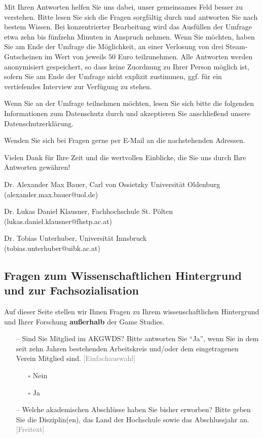 \documentclass{scrartcl}
\begin{document}
Mit Ihren Antworten helfen Sie uns dabei, unser gemeinsames Feld besser zu verstehen.
Bitte lesen Sie sich die Fragen sorgfältig durch und antworten Sie nach bestem Wissen.
Bei konzentrierter Bearbeitung wird das Ausfüllen der Umfrage etwa zehn bis fünfzehn Minuten in Anspruch nehmen.
Wenn Sie möchten, haben Sie am Ende der Umfrage die Möglichkeit, an einer Verlosung von drei Steam-Gutscheinen im Wert von jeweils $50$ Euro teilzunehmen.
Alle Antworten werden anonymisiert gespeichert, so dass keine Zuordnung zu Ihrer Person möglich ist, sofern Sie am Ende der Umfrage nicht explizit zustimmen, ggf. für ein vertiefendes Interview zur Verfügung zu stehen.

Wenn Sie an der Umfrage teilnehmen möchten, lesen Sie sich bitte die folgenden Informationen zum Datenschutz durch und akzeptieren Sie anschließend unsere Datenschutzerklärung.

Wenden Sie sich bei Fragen gerne per E-Mail an die nachstehenden Adressen.

Vielen Dank für Ihre Zeit und die wertvollen Einblicke, die Sie uns durch Ihre Antworten gewähren!

\vspace{1em}
\noindent Dr. Alexander Max Bauer, Carl von Ossietzky Universität Oldenburg\\
(alexander.max.bauer@uol.de)

\vspace{1em}
\noindent Dr. Lukas Daniel Klausner, Fachhochschule St. Pölten\\
(lukas.daniel.klausner@fhstp.ac.at)

\vspace{1em}
\noindent Dr. Tobias Unterhuber, Universität Innsbruck\\
(tobias.unterhuber@uibk.ac.at)


\subsection*{Fragen zum Wissenschaftlichen Hintergrund und zur Fachsozialisation}
Auf dieser Seite stellen wir Ihnen Fragen zu Ihrem wissenschaftlichen Hintergrund und Ihrer Forschung \textbf{außerhalb} der Game Studies.

\begin{itemize}
   \item[--] Sind Sie Mitglied im AKGWDS? Bitte antworten Sie \enquote{Ja}, wenn Sie in dem seit zehn Jahren bestehenden Arbeitskreis und/oder dem eingetragenen Verein Mitglied sind. \textcolor{gray}{\textsf{[Einfachauswahl]}}
   \begin{itemize}
      \item[$\square$] Nein
      \item[$\square$] Ja
   \end{itemize}
   \item[--] Welche akademischen Abschlüsse haben Sie bisher erworben? Bitte geben Sie die Disziplin(en), das Land der Hochschule sowie das Abschlussjahr an. \textcolor{gray}{\textsf{[Freitext]}}
\end{itemize}
\end{document}
